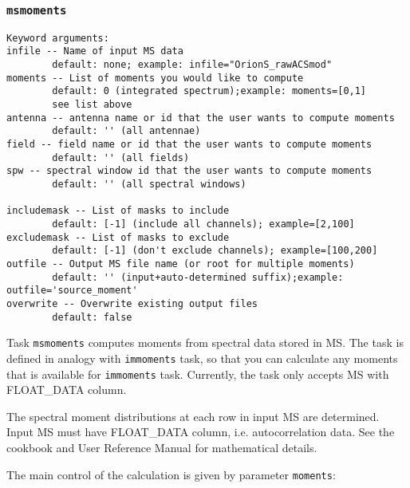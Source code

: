 \subsubsection{{\tt msmoments}}
\label{section:sd.sdtasks.tasks.sdmoments}

\begin{verbatim}
Keyword arguments:
infile -- Name of input MS data
        default: none; example: infile="OrionS_rawACSmod"
moments -- List of moments you would like to compute
        default: 0 (integrated spectrum);example: moments=[0,1]
        see list above
antenna -- antenna name or id that the user wants to compute moments
        default: '' (all antennae)
field -- field name or id that the user wants to compute moments
        default: '' (all fields)
spw -- spectral window id that the user wants to compute moments
        default: '' (all spectral windows)

includemask -- List of masks to include
        default: [-1] (include all channels); example=[2,100]
excludemask -- List of masks to exclude
        default: [-1] (don't exclude channels); example=[100,200]
outfile -- Output MS file name (or root for multiple moments)
        default: '' (input+auto-determined suffix);example: outfile='source_moment'
overwrite -- Overwrite existing output files
        default: false
\end{verbatim}

Task {\tt msmoments} computes moments from spectral data stored
in MS. The task is defined in analogy with {\tt immoments} task,
so that you can calculate any moments that is available
for {\tt  immoments} task. Currently, the task only accepts MS
with FLOAT\_DATA column.

The spectral moment distributions at each row in input MS are
determined. Input MS must have FLOAT\_DATA column, i.e. 
autocorrelation data.  
See the cookbook and User Reference Manual for
mathematical details.

The main control of the calculation is given by parameter {\tt moments}:
        
